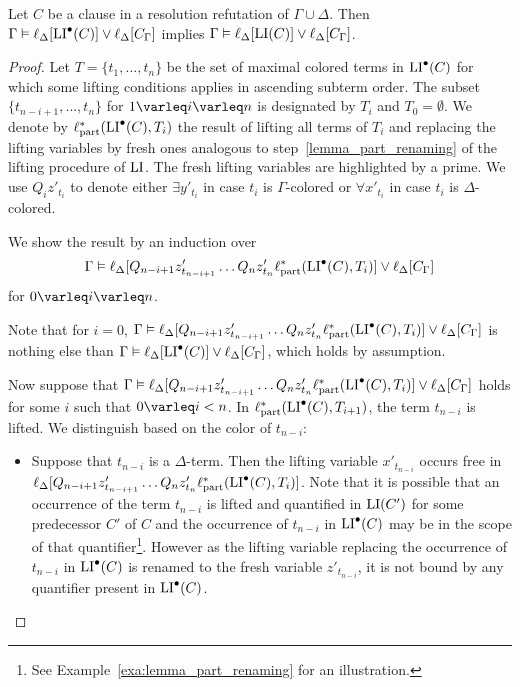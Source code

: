 \begin{lemma}
	\label{lemma:lipre_implies_li}
	Let $C$ be a clause in a resolution refutation of $\Gamma \cup \Delta$.
	Then
	$\Gamma \vDash \ell_{\Delta}[ \operatorname{LI}^\bullet(C) ] \lor \ell_{\Delta}[C_\Gamma]$
	implies 
	$\Gamma \vDash \ell_{\Delta}[ \operatorname{LI}(C) ] \lor \ell_{\Delta}[C_\Gamma]$.
\end{lemma}
\begin{proof}
	Let $T = \{t_1, \dots, t_n\}$ be the set of maximal colored terms in $\operatorname{LI}^\bullet(C)$ for which some lifting conditions applies in ascending subterm order. The subset $\{t_{n-i+1}, \dots, t_n \}$ for $1\varleq i \varleq n$ is designated by $T_i$ and $T_0 = \emptyset$.
	We denote by $\ell_\mathrm{part}^*(\operatorname{LI}^\bullet(C), T_i)$ the result of lifting all terms of $T_i$ and replacing the lifting variables by fresh ones analogous to step~\ref{lemma_part_renaming} of the lifting procedure of $\operatorname{LI}$.
	The fresh lifting variables are highlighted by a prime.
	We use $Q_i z'_{t_i}$ to denote either $\exists y'_{t_i}$ in case $t_i$ is $\Gamma$-colored or $\forall x'_{t_i}$ in case $t_i$ is $\Delta$-colored.

	We show the result by an induction over \[\Gamma \vDash \ell_{\Delta}[ Q_{n-i+1} z'_{t_{n-i+1}} \dots Q_n z'_{t_n} \ell_\mathrm{part}^*( \operatorname{LI}^\bullet(C), T_i )] \lor \ell_{\Delta}[C_\Gamma]\] for $ 0 \varleq i\varleq n$.

	Note that for $i=0$, 
	$\Gamma \vDash \ell_{\Delta}[ Q_{n-i+1} z'_{t_{n-i+1}} \dots Q_n z'_{t_n} \ell_\mathrm{part}^*( \operatorname{LI}^\bullet(C), T_i )] \lor \ell_{\Delta}[C_\Gamma]$ is nothing else than $\Gamma \vDash \ell_{\Delta}[\operatorname{LI}^\bullet(C)] \lor \ell_{\Delta}[C_\Gamma]$, which holds by assumption.

	Now suppose that $\Gamma \vDash \ell_{\Delta}[ Q_{n-i+1} z'_{t_{n-i+1}} \dots Q_n z'_{t_n} \ell_\mathrm{part}^*( \operatorname{LI}^\bullet(C), T_i )] \lor \ell_{\Delta}[C_\Gamma]$ holds for some $i$ such that $0\varleq i < n$.
	In $\ell_\mathrm{part}^*( \operatorname{LI}^\bullet(C), T_{i+1} )$, the term $t_{n-i}$ is lifted.
	We distinguish based on the color of $t_{n-i}$:
	\begin{itemize}
		\item
			Suppose that $t_{n-i}$ is a $\Delta$-term.
			Then the lifting variable $x'_{t_{n-i}}$ occurs free in $\ell_{\Delta}[ Q_{n-i+1} z'_{t_{n-i+1}} \dots Q_n z'_{t_n} \ell_\mathrm{part}^*( \operatorname{LI}^\bullet(C), T_i )]$.
			Note that it is possible that an occurrence of the term $t_{n-i}$ is lifted and quantified in $\operatorname{LI}(C')$ for some predecessor $C'$ of $C$ and the occurrence of $t_{n-i}$ in $\operatorname{LI}^\bullet(C)$ may be in the scope of that quantifier\footnote{See Example~\ref{exa:lemma_part_renaming} for an illustration.}. 
			However as the lifting variable replacing the occurrence of $t_{n-i}$ in $\operatorname{LI}^\bullet(C)$ is renamed to the fresh variable $z'_{t_{n-i}}$, it is not bound by any quantifier present in $\operatorname{LI}^\bullet(C)$.



\end{itemize}
\end{proof}
